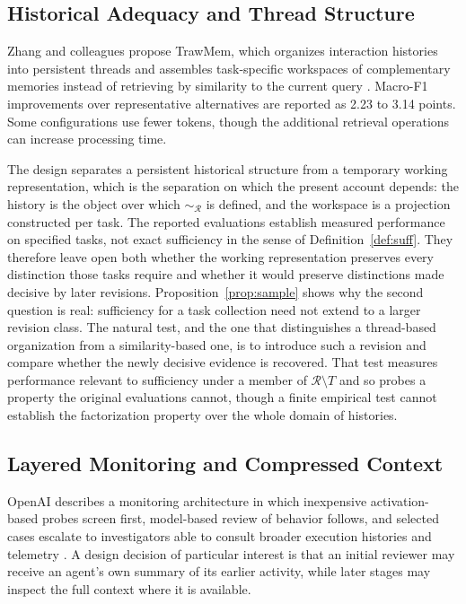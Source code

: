 \documentclass[11pt]{article}
\theoremstyle{remark}
\newcommand{\Rev}{\mathcal{R}}
\begin{document}
\subsection{Historical Adequacy and Thread Structure}

Zhang and colleagues propose TrawMem, which organizes interaction histories into persistent threads and assembles task-specific workspaces of complementary memories instead of retrieving by similarity to the current query \cite{zhang2026trawmem}. Macro-F1 improvements over representative alternatives are reported as 2.23 to 3.14 points. Some configurations use fewer tokens, though the additional retrieval operations can increase processing time.

The design separates a persistent historical structure from a temporary working representation, which is the separation on which the present account depends: the history is the object over which $\sim_{\Rev}$ is defined, and the workspace is a projection constructed per task. The reported evaluations establish measured performance on specified tasks, not exact sufficiency in the sense of Definition~\ref{def:suff}. They therefore leave open both whether the working representation preserves every distinction those tasks require and whether it would preserve distinctions made decisive by later revisions. Proposition~\ref{prop:sample} shows why the second question is real: sufficiency for a task collection need not extend to a larger revision class. The natural test, and the one that distinguishes a thread-based organization from a similarity-based one, is to introduce such a revision and compare whether the newly decisive evidence is recovered. That test measures performance relevant to sufficiency under a member of $\Rev\setminus T$ and so probes a property the original evaluations cannot, though a finite empirical test cannot establish the factorization property over the whole domain of histories.

\subsection{Layered Monitoring and Compressed Context}

OpenAI describes a monitoring architecture in which inexpensive activation-based probes screen first, model-based review of behavior follows, and selected cases escalate to investigators able to consult broader execution histories and telemetry \cite{openai2026detect}. A design decision of particular interest is that an initial reviewer may receive an agent's own summary of its earlier activity, while later stages may inspect the full context where it is available.
\end{document}
